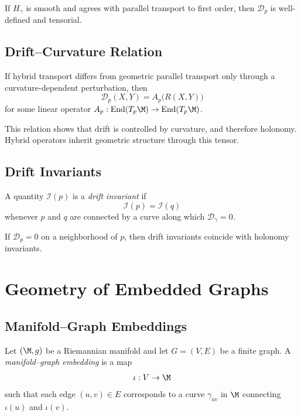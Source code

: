 \begin{lemma}
If $H_\gamma$ is smooth and agrees with parallel transport to first order,
then $\mathcal{D}_p$ is well-defined and tensorial.
\end{lemma}

\subsection{Drift–Curvature Relation}

\begin{theorem}
If hybrid transport differs from geometric parallel transport only through
a curvature-dependent perturbation, then
\[
\mathcal{D}_p(X,Y)
= A_p\big(R(X,Y)\big)
\]
for some linear operator $A_p : \mathrm{End}(T_p\M) \to \mathrm{End}(T_p\M)$.
\end{theorem}

\begin{remark}
This relation shows that drift is controlled by curvature, and therefore
holonomy.  
Hybrid operators inherit geometric structure through this tensor.
\end{remark}

\subsection{Drift Invariants}

\begin{definition}
A quantity $\mathcal{I}(p)$ is a \emph{drift invariant} if
\[
\mathcal{I}(p) = \mathcal{I}(q)
\]
whenever $p$ and $q$ are connected by a curve along which
$\mathcal{D}_\gamma = 0$.
\end{definition}

\begin{lemma}
If $\mathcal{D}_p = 0$ on a neighborhood of $p$, then drift invariants
coincide with holonomy invariants.
\end{lemma}

\section{Geometry of Embedded Graphs}

\subsection{Manifold--Graph Embeddings}

\begin{definition}
Let $(\M,g)$ be a Riemannian manifold and let $G = (V,E)$ be a finite
graph.  
A \emph{manifold--graph embedding} is a map
\[
\iota : V \to \M
\]
such that each edge $(u,v) \in E$ corresponds to a curve $\gamma_{uv}$
in $\M$ connecting $\iota(u)$ and $\iota(v)$.
\end{definition}

